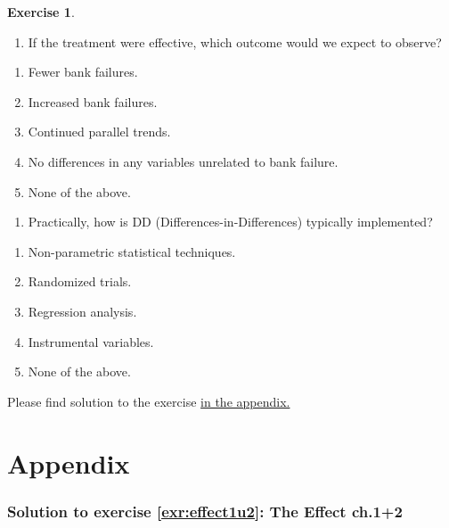 \documentclass[
  12pt,
  oneside]{book}
\providecommand{\tightlist}{%
  \setlength{\itemsep}{0pt}\setlength{\parskip}{0pt}}
\theoremstyle{definition}
\theoremstyle{definition}
\theoremstyle{definition}
\newtheorem{exercise}{Exercise}[chapter]
\theoremstyle{definition}
\theoremstyle{remark}
\begin{document}
\begin{exercise}
\begin{enumerate}
\def\labelenumi{\arabic{enumi}.}
\setcounter{enumi}{1}
\tightlist
\item
  If the treatment were effective, which outcome would we expect to observe?
\end{enumerate}

\begin{enumerate}
\def\labelenumi{\alph{enumi})}
\tightlist
\item
  Fewer bank failures.
\item
  Increased bank failures.
\item
  Continued parallel trends.
\item
  No differences in any variables unrelated to bank failure.
\item
  None of the above.
\end{enumerate}

\begin{enumerate}
\def\labelenumi{\arabic{enumi}.}
\setcounter{enumi}{2}
\tightlist
\item
  Practically, how is DD (Differences-in-Differences) typically implemented?
\end{enumerate}

\begin{enumerate}
\def\labelenumi{\alph{enumi}.}
\tightlist
\item
  Non-parametric statistical techniques.
\item
  Randomized trials.
\item
  Regression analysis.
\item
  Instrumental variables.
\item
  None of the above.
\end{enumerate}

Please find solution to the exercise \protect\hyperlink{sol:DiD}{in the appendix.}
\end{exercise}

\hypertarget{appendix}{%
\chapter{Appendix}\label{appendix}}

\hypertarget{sol:effect1u2}{%
\subsection*{Solution to exercise \ref{exr:effect1u2}: The Effect ch.1+2}\label{sol:effect1u2}}
\end{document}
